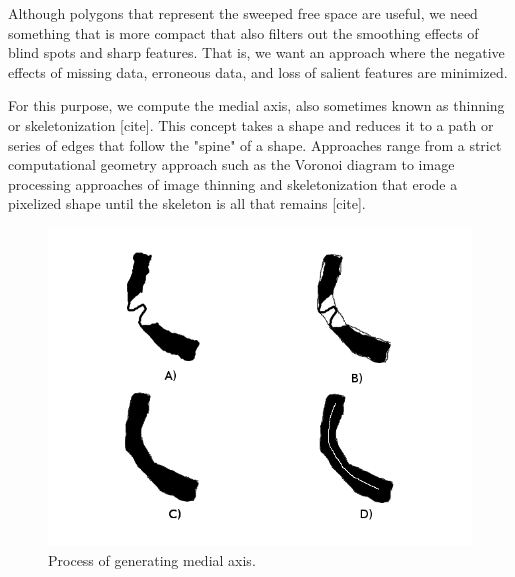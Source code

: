 Although polygons that represent the sweeped free space are useful, we need something that is more compact that also filters out the smoothing effects of blind spots and sharp features.  That is, we want an approach where the negative effects of missing data, erroneous data, and loss of salient features are minimized.

For this purpose, we compute the medial axis, also sometimes known as thinning or skeletonization [cite].  This concept takes a shape and reduces it to a path or series of edges that follow the "spine" of a shape.  Approaches range from a strict computational geometry approach such as the Voronoi diagram to image processing approaches of image thinning and skeletonization that erode a pixelized shape until the skeleton is all that remains [cite].

%

\begin{figure}
  \begin{center}
    \includegraphics[scale=0.9]{4_medial_process.png}
  \end{center}
  \caption{Process of generating medial axis.}
	\label{medial1}
\end{figure}

